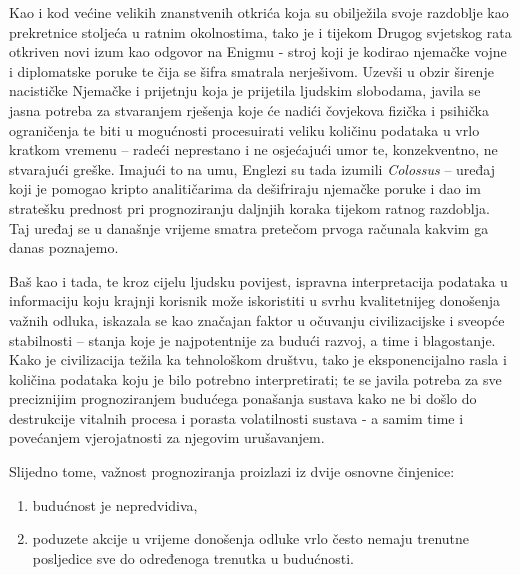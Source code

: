 \documentclass[a4paper,12pt,oneside]{memoir}
\begin{document}
        Kao i kod većine velikih znanstvenih otkrića koja su obilježila svoje razdoblje kao prekretnice stoljeća u ratnim okolnostima, tako je i tijekom Drugog svjetskog rata otkriven novi izum kao odgovor na Enigmu - stroj koji je kodirao njemačke vojne i diplomatske poruke te čija se šifra smatrala nerješivom. Uzevši u obzir širenje nacističke Njemačke i prijetnju koja je prijetila ljudskim slobodama, javila se jasna potreba za stvaranjem rješenja koje će nadići čovjekova fizička i psihička ograničenja te biti u mogućnosti procesuirati veliku količinu podataka u vrlo kratkom vremenu -- radeći neprestano i ne osjećajući umor te, konzekventno, ne stvarajući greške. Imajući to na umu, Englezi su tada izumili \textit{Colossus} -- uređaj koji je pomogao kripto analitičarima da dešifriraju njemačke poruke i dao im stratešku prednost pri prognoziranju daljnjih koraka tijekom ratnog razdoblja. Taj uređaj se u današnje vrijeme smatra pretečom prvoga računala kakvim ga danas poznajemo.

        Baš kao i tada, te kroz cijelu ljudsku povijest, ispravna interpretacija podataka u informaciju koju krajnji korisnik može iskoristiti u svrhu kvalitetnijeg donošenja važnih odluka, iskazala se kao značajan faktor u očuvanju civilizacijske i sveopće stabilnosti -- stanja koje je najpotentnije za budući razvoj, a time i blagostanje. Kako je civilizacija težila ka tehnološkom društvu, tako je eksponencijalno rasla i količina podataka koju je bilo potrebno interpretirati; te se javila potreba za sve preciznijim prognoziranjem budućega ponašanja sustava kako ne bi došlo do destrukcije vitalnih procesa i porasta volatilnosti sustava - a samim time i povećanjem vjerojatnosti za njegovim urušavanjem.

        Slijedno tome, važnost prognoziranja proizlazi iz dvije osnovne činjenice:
        \begin{enumerate}
            \item budućnost je nepredvidiva,
            \item poduzete akcije u vrijeme donošenja odluke vrlo često nemaju trenutne posljedice sve do određenoga trenutka u budućnosti.
        \end{enumerate}
\end{document}
